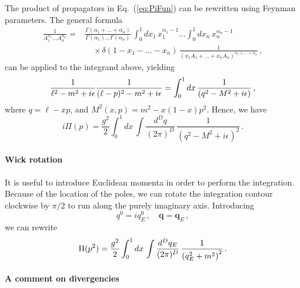 The product of propagators in Eq.~(\ref{eq:PiFun}) can be rewritten
using Feynman parameters. The general formula
\begin{align}
  \frac{1}{A_1^{\alpha_1} \ldots A_n^{\alpha_n}}
  = & \frac{\Gamma(\alpha_1+\ldots +\alpha_n)}{\Gamma(\alpha_1)\ldots
      \Gamma(\alpha_n)}\, \int_0^1 dx_1\, x_1^{\alpha_1 -1} \ldots
      \int_0^1 dx_n\, x_n^{\alpha_n -1} \nonumber \\
    & \quad \times \delta\left(1-x_1-\ldots -x_n\right)\,
      \frac{1}{\left(x_1 A_1 + \ldots + x_n
      A_n\right)^{\alpha_1 + \ldots + \alpha_n}}\, , 
\end{align}
can be applied to the integrand above, yielding
\begin{align}
  \frac{1}{\ell^2-m^2+i\epsilon} \frac{1}{(\ell-p)^2-m^2+i\epsilon} = \int_0^1dx\,
  \frac{1}{\left(q^2-M^2 +i\epsilon\right)}\, ,
\end{align}
where $q=\ell-xp$, and $M^2(x,p)=m^2-x(1-x)p^2$. Hence, we have
\begin{equation}
  \label{eq:PiAfterFeynPar}
  i\Pi(p) = \frac{g^2}{2} \int_0^1dx\, \int \frac{d^Dq}{(2\pi)^D}\, 
  \frac{1}{\left(q^2-M^2 +i\epsilon\right)^2}\, .
\end{equation}

\paragraph{Wick rotation}

It is useful to introduce Euclidean momenta in order to perform the
integration. Because of the location of the poles, we can rotate the
integration contour clockwise by $\pi/2$ to run along the purely
imaginary axis. Introducing
\begin{equation}
  \label{eq:EuclideanMom}
  q^0 = i q^0_E\, , \quad \mathbf{q} = \mathbf{q}_E\, ,
\end{equation}
we can rewrite
\begin{equation}
  \label{eq:PiEuclMom}
  \Pi(p^2) = \frac{g^2}{2} \int_0^1dx\, \int \frac{d^Dq_E}{(2\pi)^D}\, 
  \frac{1}{\left(q_E^2+m^2\right)^2}\, .
\end{equation}

\paragraph{A comment on divergencies}

